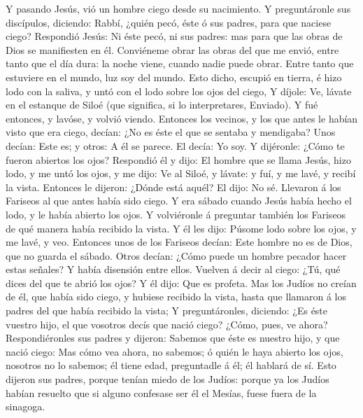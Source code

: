  Y pasando Jesús, vió un hombre ciego desde su nacimiento.
 Y preguntáronle sus discípulos, diciendo: Rabbí, ¿quién
pecó, éste ó sus padres, para que naciese ciego?  Respondió
Jesús: Ni éste pecó, ni sus padres: mas para que las obras de Dios se
manifiesten en él.  Conviéneme obrar las obras del que me
envió, entre tanto que el día dura: la noche viene, cuando nadie puede
obrar.  Entre tanto que estuviere en el mundo, luz soy del
mundo.  Esto dicho, escupió en tierra, é hizo lodo con la
saliva, y untó con el lodo sobre los ojos del ciego,  Y
díjole: Ve, lávate en el estanque de Siloé (que significa, si lo
interpretares, Enviado). Y fué entonces, y lavóse, y volvió viendo.
 Entonces los vecinos, y los que antes le habían visto que
era ciego, decían: ¿No es éste el que se sentaba y mendigaba?
 Unos decían: Este es; y otros: A él se parece. El decía: Yo
soy.  Y dijéronle: ¿Cómo te fueron abiertos los ojos?
 Respondió él y dijo: El hombre que se llama Jesús, hizo
lodo, y me untó los ojos, y me dijo: Ve al Siloé, y lávate: y fuí, y me
lavé, y recibí la vista.  Entonces le dijeron: ¿Dónde está
aquél? El dijo: No sé.  Llevaron á los Fariseos al que
antes había sido ciego.  Y era sábado cuando Jesús había
hecho el lodo, y le había abierto los ojos.  Y volviéronle
á preguntar también los Fariseos de qué manera había recibido la vista.
Y él les dijo: Púsome lodo sobre los ojos, y me lavé, y veo.
 Entonces unos de los Fariseos decían: Este hombre no es de
Dios, que no guarda el sábado. Otros decían: ¿Cómo puede un hombre
pecador hacer estas señales? Y había disensión entre ellos.
 Vuelven á decir al ciego: ¿Tú, qué dices del que te abrió
los ojos? Y él dijo: Que es profeta.  Mas los Judíos no
creían de él, que había sido ciego, y hubiese recibido la vista, hasta
que llamaron á los padres del que había recibido la vista; 
Y preguntáronles, diciendo: ¿Es éste vuestro hijo, el que vosotros decís
que nació ciego? ¿Cómo, pues, ve ahora?  Respondiéronles
sus padres y dijeron: Sabemos que éste es nuestro hijo, y que nació
ciego:  Mas cómo vea ahora, no sabemos; ó quién le haya
abierto los ojos, nosotros no lo sabemos; él tiene edad, preguntadle á
él; él hablará de sí.  Esto dijeron sus padres, porque
tenían miedo de los Judíos: porque ya los Judíos habían resuelto que si
alguno confesase ser él el Mesías, fuese fuera de la sinagoga.
